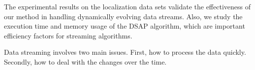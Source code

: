 The experimental results on the localization data sets validate the effectiveness of our method in handling
dynamically evolving data streams. Also, we study the execution time and memory usage of the DSAP algorithm, which are important efficiency factors for streaming algorithms.











Data streaming involves two main issues. First, how to process the data quickly.
Secondly, how to deal with the changes over the time.












